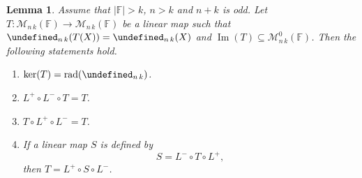 \documentclass{elsarticle}
\DeclareMathOperator{\rad}{rad}
\DeclareMathOperator{\Ker}{ker}
\DeclareMathOperator{\Img}{Im}
\def\F{{\mathbb F}}
\def\M{{\mathcal M}}
\let\det\undefined
\DeclareMathOperator{\det}{det}
\theoremstyle{plain}
\newtheorem{lemma}[theorem]{Lemma}
\theoremstyle{definition}
\numberwithin{equation}{section}
\begin{document}
\begin{lemma}\label{lem:FromNKOddToNKEvenIfKerW}Assume that  $|\F| > k$, $n > k$ and $n + k$ is odd. Let $T\colon \M_{n\, k} (\F) \to \M_{n\, k} (\F)$ be a linear map such that $\det_{n\, k} (T(X)) = \det_{n\,k}(X)$ and $\Img(T) \subseteq \M^0_{n\,k}(\F)$. Then the following statements hold.
\begin{enumerate}[label=(\alph*), ref=(\alph*)]
\item\label{lem:FromNKOddToNKEvenIfKerW:part4} $\Ker(T) = \rad(\det_{n\,k})$.
\item\label{lem:FromNKOddToNKEvenIfKerW:part5} $L^{+}\circ L^{-} \circ T = T$.
\item\label{lem:FromNKOddToNKEvenIfKerW:part6} $T \circ L^{+} \circ L^{-} = T$.
\item\label{lem:FromNKOddToNKEvenIfKerW:part2} If a linear map $S$ is defined by 
\begin{equation}\label{lem:FromNKOddToNKEvenIfKerW:eq}
S = L^{-} \circ T \circ L^{+},
\end{equation}
then $T = L^{+} \circ S \circ L^{-}$.
\end{enumerate}
\end{lemma}
\end{document}
